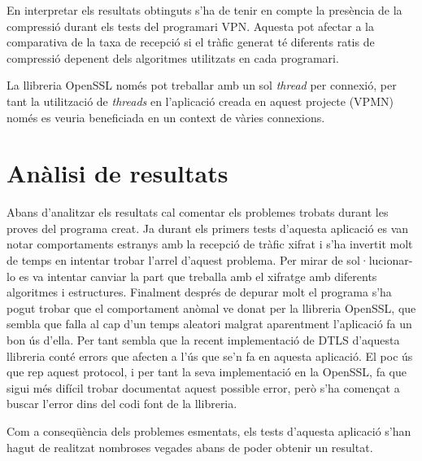 En interpretar els resultats obtinguts s'ha de tenir en compte la presència de la compressió durant els tests del programari VPN. Aquesta pot afectar a la comparativa de la taxa de recepció si el tràfic generat té diferents ratis de compressió depenent dels algoritmes utilitzats en cada programari.

La llibreria OpenSSL només pot treballar amb un sol \emph{thread} per connexió, per tant la utilització de \emph{threads} en l'aplicació creada en aquest projecte (VPMN) només es veuria beneficiada en un context de vàries connexions.


\section{Anàlisi de resultats}
Abans d'analitzar els resultats cal comentar els problemes trobats durant les proves del programa creat. 
Ja durant els primers tests d'aquesta aplicació es van notar comportaments estranys amb la recepció de tràfic xifrat i s'ha invertit molt de temps en intentar trobar l'arrel d'aquest problema. Per mirar de sol·lucionar-lo es va intentar canviar la part que treballa amb el xifratge amb diferents algoritmes i estructures. Finalment després de depurar molt el programa s'ha pogut trobar que el comportament anòmal ve donat per la llibreria OpenSSL, que sembla que falla al cap d'un temps aleatori malgrat aparentment l'aplicació fa un bon ús d'ella. Per tant sembla que la recent implementació de DTLS d'aquesta llibreria conté errors que afecten a l'ús que se'n fa en aquesta aplicació.
El poc ús que rep aquest protocol, i per tant la seva implementació en la OpenSSL, fa que sigui més difícil trobar documentat aquest possible error, però s'ha començat a buscar l'error dins del codi font de la llibreria.

Com a conseqüència dels problemes esmentats, els tests d'aquesta aplicació s'han hagut de realitzat nombroses vegades abans de poder obtenir un resultat.

